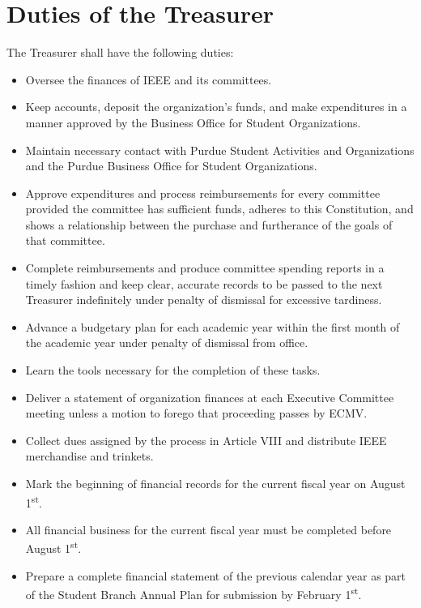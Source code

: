 \documentclass[12pt]{constitution}
\newcommand{\dateannualplansubmit}{February 1\textsuperscript{st}} %
\newcommand{\datefiscalstart}{August 1\textsuperscript{st}} %
\begin{document}
\section{Duties of the Treasurer}
\label{sec:officer_treas}
The Treasurer shall have the following duties:
\begin{itemize}
    \item Oversee the finances of IEEE and its committees.
    \item Keep accounts, deposit the organization's funds, and make expenditures in a manner approved by the Business Office for Student Organizations.
    \item Maintain necessary contact with Purdue Student Activities and Organizations and the Purdue Business Office for Student Organizations.
    \item Approve expenditures and process reimbursements for every committee provided the committee has sufficient funds, adheres to this Constitution, and shows a relationship between the purchase and furtherance of the goals of that committee.
    \item Complete reimbursements and produce committee spending reports in a timely fashion and keep clear, accurate records to be passed to the next Treasurer indefinitely under penalty of dismissal for excessive tardiness.
    \item Advance a budgetary plan for each academic year within the first month of the academic year under penalty of dismissal from office.
    \item Learn the tools necessary for the completion of these tasks.
    \item Deliver a statement of organization finances at each Executive Committee meeting unless a motion to forego that proceeding passes by ECMV.
    \item Collect dues assigned by the process in Article VIII and distribute IEEE merchandise and trinkets.
    \item Mark the beginning of financial records for the current fiscal year on \datefiscalstart{}.
    \item All financial business for the current fiscal year must be completed before \datefiscalstart{}.
    \item Prepare a complete financial statement of the previous calendar year as part of the Student Branch Annual Plan for submission by \dateannualplansubmit{}.
\end{itemize}
\end{document}

